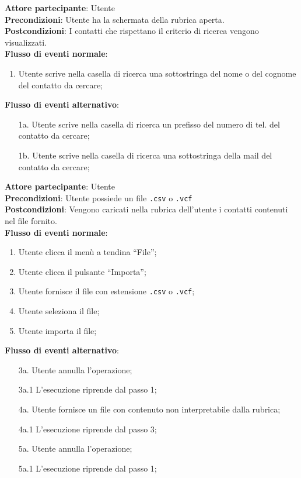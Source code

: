 \begin{tcolorbox}[colback=white,colframe=black!80!white,title=\textbf{C4 - Cercare contatto}]
	\textbf{Attore partecipante}: Utente
	\\\textbf{Precondizioni}: Utente ha la schermata della rubrica aperta.
	\\\textbf{Postcondizioni}: I contatti che rispettano il criterio di ricerca vengono visualizzati.
	\\\textbf{Flusso di eventi normale}:
	\begin{enumerate}[noitemsep, topsep=0pt]
		\item Utente scrive nella casella di ricerca una sottostringa del nome o del cognome del contatto da cercare;
	\end{enumerate}
	\textbf{Flusso di eventi alternativo}:
	\begin{itemize}[noitemsep, topsep=0pt]
		\item[1a.] Utente scrive nella casella di ricerca un prefisso del numero di tel. del contatto da cercare;
		\item[1b.] Utente scrive nella casella di ricerca una sottostringa della mail del contatto da cercare;
	\end{itemize}
\end{tcolorbox}

\begin{tcolorbox}[colback=white,colframe=black!80!white,title=\textbf{C5 - Importare rubrica}]
	\textbf{Attore partecipante}: Utente
	\\\textbf{Precondizioni}: Utente possiede un file \texttt{.csv} o \texttt{.vcf}
	\\\textbf{Postcondizioni}: Vengono caricati nella rubrica dell’utente i contatti contenuti nel file fornito.
	\\\textbf{Flusso di eventi normale}:
	\begin{enumerate}[noitemsep, topsep=0pt]
		\item Utente clicca il menù a tendina “File”;
		\item Utente clicca il pulsante “Importa”;
		\item Utente fornisce il file con estensione \texttt{.csv} o \texttt{.vcf};
		\item Utente seleziona il file;
		\item Utente importa il file;	
	\end{enumerate}
	\textbf{Flusso di eventi alternativo}:
	\begin{itemize}[noitemsep, topsep=0pt]
		\item[3a. ] Utente annulla l’operazione;
		\item[3a.1] L’esecuzione riprende dal passo 1;
		\item[4a. ] Utente fornisce un file con contenuto non interpretabile dalla rubrica;
		\item[4a.1] L’esecuzione riprende dal passo 3;
		\item[5a. ] Utente annulla l’operazione;
		\item[5a.1] L’esecuzione riprende dal passo 1;
		
	\end{itemize}
\end{tcolorbox}

